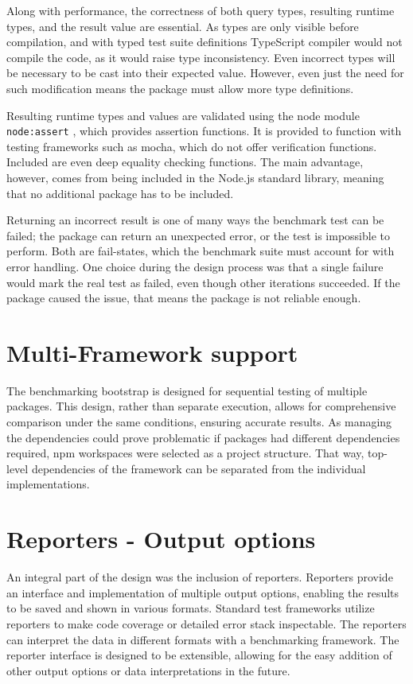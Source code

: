 Along with performance, the correctness of both query types, resulting runtime
types, and the result value are essential. As types are only visible before
compilation, and with typed test suite definitions TypeScript compiler would not
compile the code, as it would raise type inconsistency. Even incorrect types
will be necessary to be cast into their expected value. However, even just the
need for such modification means the package must allow more type definitions.

Resulting runtime types and values are validated using the node module
\texttt{node:assert} \cite{NodeAssert}, which provides assertion functions. It
is provided to function with testing frameworks such as mocha, which do not
offer verification functions. Included are even deep equality checking
functions. The main advantage, however, comes from being included in the Node.js
standard library, meaning that no additional package has to be included.

Returning an incorrect result is one of many ways the benchmark test can be
failed; the package can return an unexpected error, or the test is impossible to
perform. Both are fail-states, which the benchmark suite must account for with
error handling. One choice during the design process was that a single failure
would mark the real test as failed, even though other iterations succeeded. If
the package caused the issue, that means the package is not reliable enough.

\section{Multi-Framework support}

The benchmarking bootstrap is designed for sequential testing of multiple
packages. This design, rather than separate execution, allows for comprehensive
comparison under the same conditions, ensuring accurate results. As managing the
dependencies could prove problematic if packages had different dependencies
required, npm workspaces \cite{npmWorkspaces} were selected as a project
structure. That way, top-level dependencies of the framework can be separated
from the individual implementations.

\section{Reporters - Output options}

An integral part of the design was the inclusion of reporters. Reporters provide
an interface and implementation of multiple output options, enabling the results
to be saved and shown in various formats. Standard test frameworks utilize
reporters to make code coverage or detailed error stack inspectable. The
reporters can interpret the data in different formats with a benchmarking
framework. The reporter interface is designed to be extensible, allowing for the
easy addition of other output options or data interpretations in the future.